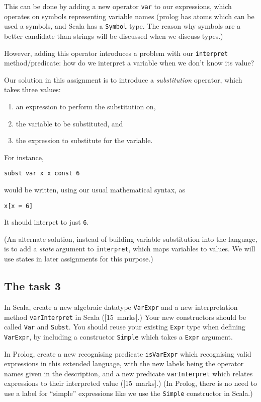 \documentclass[11pt]{article}
\begin{document}
This can be done by adding a new operator \texttt{var} to our expressions,
which operates on symbols representing variable names
(prolog has atoms which can be used a symbols,
and Scala has a \texttt{Symbol} type. The reason why symbols
are a better candidate than strings will be discussed
when we discuss types.)

However, adding this operator introduces a problem
with our \texttt{interpret} method/predicate:
how do we interpret a variable when we don't know its value?

Our solution in this assignment is to
introduce a \emph{substitution} operator,
which takes three values:
\begin{enumerate}
\item an expression to perform the substitution on,
\item the variable to be substituted, and
\item the expression to substitute for the variable.
\end{enumerate}

For instance,
\begin{verbatim}
subst var x x const 6
\end{verbatim}
would be written, using our usual mathematical syntax, as
\begin{verbatim}
x[x ≔ 6]
\end{verbatim}
It should interpet to just \texttt{6}.

(An alternate solution,
instead of building variable substitution into the language,
is to add a \emph{state} argument to \texttt{interpret},
which maps variables to values.
We will use states in later assignments for this purpose.)

\subsection*{The task 3}
\label{sec:org4f1336b}
In Scala, create a new algebraic datatype \texttt{VarExpr} and a new
interpretation method \texttt{varInterpret} in Scala ([15 marks].)
Your new constructors should be called \texttt{Var} and \texttt{Subst}.
You should reuse your existing \texttt{Expr} type when defining \texttt{VarExpr},
by including a constructor \texttt{Simple} which takes a \texttt{Expr} argument.

In Prolog, create a new recognising predicate \texttt{isVarExpr} which
recognising valid expressions in this extended language,
with the new labels being the operator names given in the description,
and a new predicate \texttt{varInterpret} which relates
expressions to their interpreted value ([15 marks].)
(In Prolog, there is no need to use
a label for “simple” expressions like we use
the \texttt{Simple} constructor in Scala.)
\end{document}
